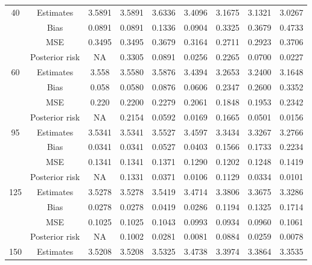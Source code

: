 \documentclass[a4paper,12pt]{report}
\begin{document}
{\begin{minipage}{\linewidth}
{\begin{tabular}{|c|c|c|c|c|c|c|c|c|}
			40		&Estimates      &3.5891 &3.5891 &3.6336 &3.4096 &3.1675 &3.1321 &3.0267 \\
			&Bias           &0.0891 &0.0891 &0.1336 &0.0904 &0.3325 &0.3679 &0.4733 \\
			&MSE            &0.3495 &0.3495 &0.3679 &0.3164 &0.2711 &0.2923 &0.3706 \\
			&Posterior risk    &NA &0.3305 &0.0891 &0.0256 &0.2265 &0.0700 &0.0227 \\ \hline
			60		&Estimates      &3.558 &3.5580 &3.5876 &3.4394 &3.2653 &3.2400 &3.1648 \\
			&Bias           &0.058 &0.0580 &0.0876 &0.0606 &0.2347 &0.2600 &0.3352 \\
			&MSE            &0.220 &0.2200 &0.2279 &0.2061 &0.1848 &0.1953 &0.2342 \\
			&Posterior risk   &NA &0.2154 &0.0592 &0.0169 &0.1665 &0.0501 &0.0156 \\ \hline
			95		&Estimates      &3.5341 &3.5341 &3.5527 &3.4597 &3.3434 &3.3267 &3.2766 \\
			&Bias           &0.0341 &0.0341 &0.0527 &0.0403 &0.1566 &0.1733 &0.2234 \\
			&MSE            &0.1341 &0.1341 &0.1371 &0.1290 &0.1202 &0.1248 &0.1419 \\
			&Posterior risk    &NA &0.1331 &0.0371 &0.0106 &0.1129 &0.0334 &0.0101 \\ \hline
			125		&Estimates      &3.5278 &3.5278 &3.5419 &3.4714 &3.3806 &3.3675 &3.3286 \\
			&Bias           &0.0278 &0.0278 &0.0419 &0.0286 &0.1194 &0.1325 &0.1714 \\
			&MSE            &0.1025 &0.1025 &0.1043 &0.0993 &0.0934 &0.0960 &0.1061 \\
			&Posterior risk    &NA &0.1002 &0.0281 &0.0081 &0.0884 &0.0259 &0.0078 \\ \hline
			150		&Estimates      &3.5208 &3.5208 &3.5325 &3.4738 &3.3974 &3.3864 &3.3535 \\

\end{tabular}}
\end{minipage}}
\end{document}
